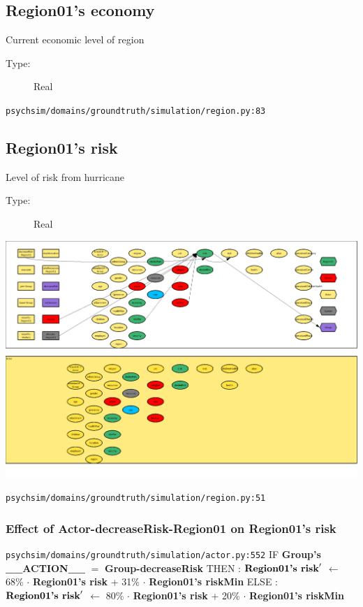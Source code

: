 \documentclass{article}%
\begin{document}
%
\subsection{Region01's economy}%
\label{subsec:Region01's economy}%
Current economic level of region%
\begin{description}%
\item[Type:]%
Real%
\end{description}%
\begin{flushleft}%
\verb|psychsim/domains/groundtruth/simulation/region.py:83|%
\end{flushleft}

%
\subsection{Region01's risk}%
\label{subsec:Region01's risk}%
Level of risk from hurricane%
\begin{description}%
\item[Type:]%
Real%
\end{description}%
\includegraphics[width=\textwidth]{images/riskOfRegion01.png}%
\begin{flushleft}%
\verb|psychsim/domains/groundtruth/simulation/region.py:51|%
\end{flushleft}%
\subsubsection{Effect of Actor{-}decreaseRisk{-}Region01 on Region01's risk}%
\label{ssubsec:Effect of Actor{-}decreaseRisk{-}Region01 on Region01's risk}%
\begin{flushleft}%
\verb|psychsim/domains/groundtruth/simulation/actor.py:552|%
\linebreak%
IF %
\textbf{Group's \_\_ACTION\_\_}%
$=$%
\textbf{Group{-}decreaseRisk}%
\linebreak%
\hspace*{2em}%
THEN %
: %
$\mbox{\textbf{Region01's risk}} '$%
$\leftarrow$%
68\%%
$\cdot$%
\textbf{Region01's risk}%
+%
31\%%
$\cdot$%
\textbf{Region01's riskMin}%
\linebreak%
\hspace*{2em}%
ELSE %
: %
$\mbox{\textbf{Region01's risk}} '$%
$\leftarrow$%
80\%%
$\cdot$%
\textbf{Region01's risk}%
+%
20\%%
$\cdot$%
\textbf{Region01's riskMin}%
\end{flushleft}
\end{document}
